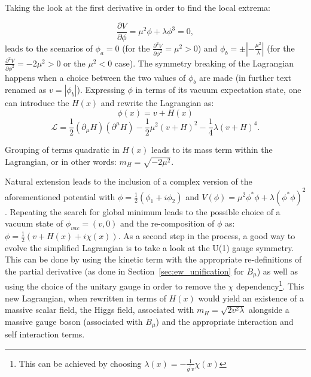 Taking the look at the first derivative in order to find the local extrema:

\begin{equation}
    \frac{\partial V}{\partial \phi} = \mu^2\phi + \lambda \phi^3 = 0,
\end{equation}
leads to the scenarios of $\phi_a = 0$ (for the $\frac{\partial^2 V}{\partial \phi^2} = \mu^2>0$) and $\phi_b = \pm|-\frac{\mu^2}{\lambda}|$ (for the $\frac{\partial^2 V}{\partial \phi^2} = -2\mu^2>0$ or the $\mu^2<0$ case). The symmetry breaking of the Lagrangian happens when a choice between the two values of $\phi_b$ are made (in further text renamed as $v = |\phi_b|$). Expressing $\phi$ in terms of its vacuum expectation state, one can introduce the $H(x)$ and rewrite the Lagrangian as:
\begin{equation}
    \phi(x) = v+H(x)
\end{equation}
\begin{equation}
    \mathcal{L} = \frac{1}{2}(\partial_{\mu}H)(\partial^{\mu}H) - \frac{1}{2}\mu^2(v+H)^2 - \frac{1}{4}\lambda(v+H)^4.
\end{equation}

Grouping of terms quadratic in $H(x)$ leads to its mass term within the Lagrangian, or in other words: $m_{H} = \sqrt{-2\mu^2}$.

\hspace{10pt} Natural extension leads to the inclusion of a complex version of the aforementioned potential with $\phi = \frac{1}{2} (\phi_1+i\phi_2)$ and $V(\phi) = \mu^2\phi^*\phi+\lambda(\phi^*\phi)^2$. Repeating the search for global minimum leads to the possible choice of a vacuum state of $\phi_{vac} = (v, 0)$ and the re-composition of $\phi$ as: $\phi = \frac{1}{2}(v+H(x)+i\chi(x))$. As a second step in the process, a good way to evolve the simplified Lagrangian is to take a look at the U(1) gauge symmetry. This can be done by using the kinetic term with the appropriate re-definitions of the partial derivative (as done in Section~\ref{sec:ew_unification} for $B_{\mu}$) as well as using the choice of the unitary gauge in order to remove the $\chi$ dependency\footnote{This can be achieved by choosing $\lambda(x) = -\frac{1}{g^{'}v}\chi(x)$}. This new Lagrangian, when rewritten in terms of $H(x)$ would yield an existence of a massive scalar field, the Higgs field, associated with $m_{H} =\sqrt{2v^2\lambda}$ alongside a massive gauge boson (associated with $B_{\mu}$) and the appropriate interaction and self interaction terms.

